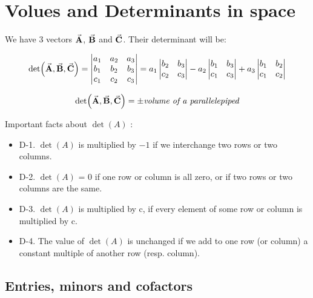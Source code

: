 \documentclass{article}
\begin{document}
    \section{Volues and Determinants in space}

    We have 3 vectors $\va{A}$, $\va{B}$ and $\va{C}$. Their determinant will be:

    \begin{align}
        \det(\va{A}, \va{B}, \va{C})
        =\mdet{
        a_1 & a_2 & a_3 \\
        b_1 & b_2 & b_3 \\
        c_1 & c_2 & c_ 3
        }
        =a_1 \mdet{b_2 & b_3 \\ c_2 & c_3 }
        -a_2 \mdet{b_1 & b_3 \\ c_1 & c_3}
        +a_3 \mdet{b_1 & b_2 \\ c_1 & c_2}
    \end{align}

    \begin{theorem}
        \[\det(\va{A}, \va{B}, \va{C})=\pm\text{\emph{volume of a parallelepiped}}\]
    \end{theorem}

    Important facts about $\det(A)$ :
    \begin{itemize}
        \item D-1. $\det(A)$ is multiplied by $−1$ if we interchange two rows or two columns.
        \item D-2. $\det(A)$ = 0 if one row or column is all zero, or if two rows or two columns are the
        same.
        \item D-3. $\det(A)$ is multiplied by c, if every element of some row or column is multiplied by c.
        \item D-4. The value of $\det(A)$ is unchanged if we add to one row (or column) a constant multiple
        of another row (resp. column).
    \end{itemize}

    \subsection{Entries, minors and cofactors}
\end{document}
